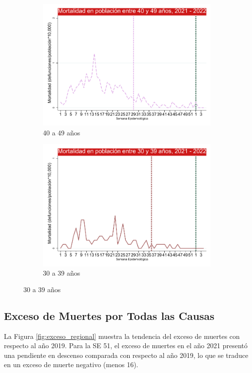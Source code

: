 \documentclass[12pt,a4paper,openany]{book}
\begin{document}
\begin{figure}[h]
	\vspace{10mm}
	\begin{subfigure}[b]{0.45\textwidth}
		\centering
		\includegraphics[width=\textwidth]{../figuras/mortalidad_edad_40.pdf}
		\caption{40 a 49 años}
	\end{subfigure}
	\hfill
	\begin{subfigure}[b]{0.45\textwidth}
		\centering
		\includegraphics[width=\textwidth]{../figuras/mortalidad_edad_30.pdf}
		\caption{30 a 39 años}
	\end{subfigure}
	\end{figure}

	\subsection*{Exceso de Muertes por Todas las Causas}
	\noindent  La Figura \ref{fig:exceso_regional} muestra la tendencia del exceso de muertes con respecto al año 2019. Para la SE 51, el exceso de muertes en el año 2021 presentó una pendiente en descenso comparada con respecto al año 2019, lo que se traduce en un exceso de muerte negativo (menos 16). 
\end{document}
